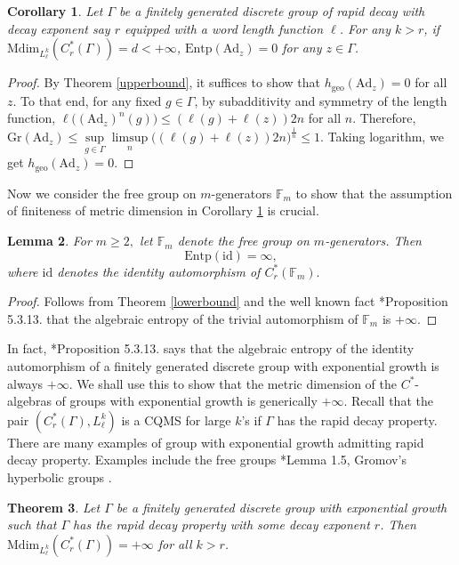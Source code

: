 \documentclass[a4paper,11pt,reqno]{amsart}
\theoremstyle{plain}
\newtheorem{thm}{Theorem}[section]
\newtheorem{cor}[thm]{Corollary}
\newtheorem{lem}[thm]{Lemma}
\theoremstyle{mainthmstyle}
\theoremstyle{named}
\numberwithin{equation}{section}
\begin{document}
\begin{cor}\label{innerzero}
 Let $\Gamma$ be a finitely generated discrete group of rapid decay with decay exponent say $r$ equipped with a word length function $\ell$. For any $k>r$, if $\mathrm{Mdim}_{L^{k}_{\ell}}(C^{\ast}_{r}(\Gamma))=d<+\infty$, $\mathrm{Entp}(\mathrm{Ad}_z)=0$ for any $z\in\Gamma$.   
\end{cor}
\begin{proof}
    By Theorem \ref{upperbound}, it suffices to show that $h_{\mathrm{geo}}(\mathrm{Ad}_{z})=0$ for all $z$. To that end, for any fixed $g\in\Gamma$, by subadditivity and symmetry of the length function, $\ell\Big((\mathrm{Ad}_{z})^{n}(g)\Big)\leq (\ell(g)+\ell(z))2n$ for all $n$. Therefore, $\mathrm{Gr}(\mathrm{Ad}_{z})\leq\sup\limits_{g\in\Gamma} \limsup\limits_{n}\Big((\ell(g)+\ell(z))2n\Big)^{\frac{1}{n}} \leq 1$. Taking logarithm, we get $h_{\mathrm{geo}}(\mathrm{Ad}_{z})=0$.
\end{proof} 
Now we consider the free group on $m$-generators $\mathbb{F}_{m}$ to show that the assumption of finiteness of metric dimension in Corollary \ref{innerzero} is crucial.
 \begin{lem}\label{freegroupinner}
For $m \geq 2,$ let $\mathbb{F}_{m}$ denote the free group on $m$-generators. Then $$\mathrm {Entp} \left (\mathrm {id} \right ) = \infty,$$ where $\mathrm {id}$ denotes the identity automorphism of $C_r^{\ast} \left (\mathbb{F}_{m} \right ).$
\end{lem}
\begin{proof}
Follows from Theorem \ref{lowerbound} and the well known fact \cite{Dikranjan2013TopologicalEA}*{Proposition 5.3.13.} that the algebraic entropy of the trivial automorphism of $\mathbb{F}_{m}$ is $+\infty$.\end{proof}
In fact, \cite{Dikranjan2013TopologicalEA}*{Proposition 5.3.13.}  says that the algebraic entropy of the identity automorphism of a finitely generated discrete group with exponential growth is always $+\infty$. We shall use this to show that the metric dimension of the $C^{\ast}$-algebras of groups with exponential growth is generically $+\infty$. Recall that the pair $(C^{\ast}_{r}(\Gamma),L^{k}_{\ell})$ is a CQMS for large $k$'s if $\Gamma$ has the rapid decay property. There are many examples of group with exponential growth admitting rapid decay property. Examples include the free groups \cite{Haagerup}*{Lemma 1.5}, Gromov's hyperbolic groups \cites{MR943303, de1988groupes}.
\begin{thm}\label{expoinfty}
    Let $\Gamma$ be a finitely generated discrete group with exponential growth such that $\Gamma$ has the rapid decay property with some decay exponent $r$. Then $\mathrm{Mdim}_{L^{k}_{\ell}}(C^{\ast}_{r}(\Gamma))=+\infty$ for all $k>r$.  
\end{thm}
\end{document}

